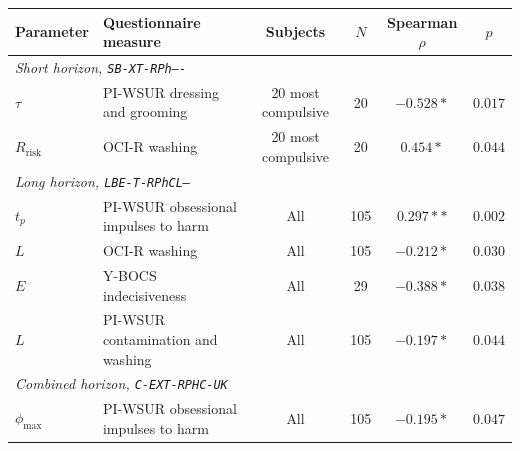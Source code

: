 \begin{tabular}{llcccc}
\toprule
Parameter & Questionnaire measure & Subjects & $N$ & Spearman $\rho$ & $p$ \\
\midrule
\multicolumn{6}{l}{\textit{Short horizon, \texttt{SB-XT-RPh----}}} \\
$\tau$ & PI-WSUR dressing and grooming & 20 most compulsive & 20 & $-0.528*$ & $0.017$ \\
$R_{\mathrm{risk}}$ & OCI-R washing & 20 most compulsive & 20 & $0.454*$ & $0.044$ \\
\midrule
\multicolumn{6}{l}{\textit{Long horizon, \texttt{LBE-T-RPhCL--}}} \\
$t_p$ & PI-WSUR obsessional impulses to harm & All & 105 & $0.297**$ & $0.002$ \\
$L$ & OCI-R washing & All & 105 & $-0.212*$ & $0.030$ \\
$E$ & Y-BOCS indecisiveness & All & 29 & $-0.388*$ & $0.038$ \\
$L$ & PI-WSUR contamination and washing & All & 105 & $-0.197*$ & $0.044$ \\
\midrule
\multicolumn{6}{l}{\textit{Combined horizon, \texttt{C-EXT-RPHC-UK}}} \\
$\phi_{\max}$ & PI-WSUR obsessional impulses to harm & All & 105 & $-0.195*$ & $0.047$ \\
\bottomrule
\end{tabular}
